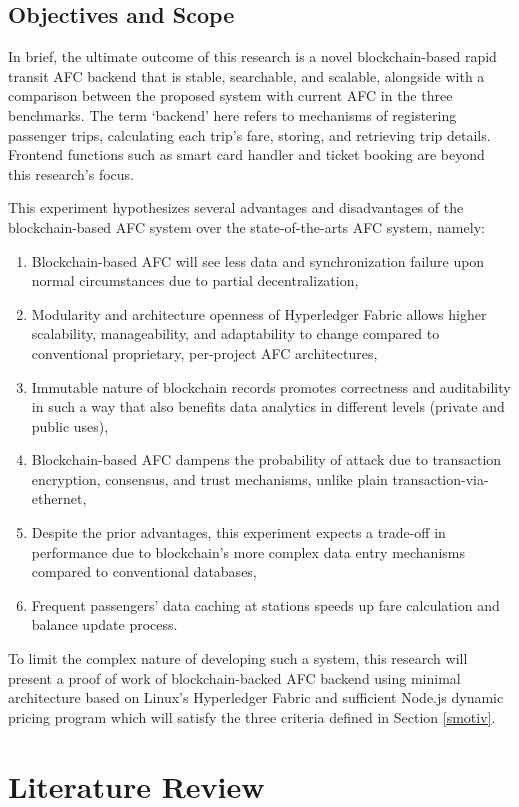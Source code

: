 \documentclass[a4paper,12pt,oneside, utf8x]{report}
\begin{document}
\section{Objectives and Scope}
In brief, the ultimate outcome of this research is a novel blockchain-based rapid transit AFC backend that is stable, searchable, and scalable, alongside with a comparison between the proposed system with current AFC in the three benchmarks. The term ‘backend’ here refers to mechanisms of registering passenger trips, calculating each trip’s fare, storing, and retrieving trip details. Frontend functions such as smart card handler and ticket booking are beyond this research’s focus.

This experiment hypothesizes several advantages and disadvantages of the blockchain-based AFC system over the state-of-the-arts AFC system, namely:
\begin{enumerate}
\item Blockchain-based AFC will see less data and synchronization failure upon normal circumstances due to partial decentralization,
\item Modularity and architecture openness of Hyperledger Fabric allows higher scalability, manageability, and adaptability to change compared to conventional proprietary, per-project AFC architectures,
\item Immutable nature of blockchain records promotes correctness and auditability in such a way that also benefits data analytics in different levels (private and public uses),
\item Blockchain-based AFC dampens the probability of attack due to transaction encryption, consensus, and trust mechanisms, unlike plain transaction-via-ethernet,
\item Despite the prior advantages, this experiment expects a trade-off in performance due to blockchain’s more complex data entry mechanisms compared to conventional databases,
\item Frequent passengers' data caching at stations speeds up fare calculation and balance update process.
\end{enumerate}

To limit the complex nature of developing such a system, this research will present a proof of work of blockchain-backed AFC backend using minimal architecture based on Linux’s Hyperledger Fabric and sufficient Node.js dynamic pricing program which will satisfy the three criteria defined in Section \ref{smotiv}.

\chapter{Literature Review}
\label{clreview}
\end{document}
